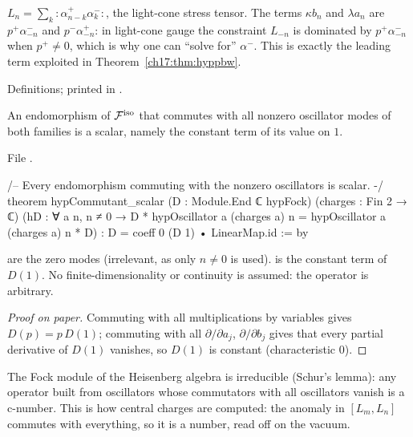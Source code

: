 \begin{physics}
$L_n=\sum_k{:}\alpha^+_{n-k}\alpha^-_k{:}$, the light-cone stress tensor.  The terms $\kappa b_n$ and $\lambda a_n$ are
$p^+\alpha^-_{-n}$ and $p^-\alpha^+_{-n}$: in light-cone gauge the constraint $L_{-n}$ is dominated by
$p^+\alpha^-_{-n}$ when $p^+\neq0$, which is why one can ``solve for'' $\alpha^-$.  This is exactly the leading term
exploited in Theorem~\ref{ch17:thm:hyppbw}.
\end{physics}

\begin{status}
Definitions; printed in .
\end{status}

\begin{theorem}[Commutant]\label{ch17:thm:hypcommutant}
An endomorphism of $\mathcal{F}^{\mathrm{iso}}$ that commutes with all nonzero oscillator modes of both families is a
scalar, namely the constant term of its value on $1$.
\end{theorem}

\noindent File .
\begin{leancode}
/-- Every endomorphism commuting with the nonzero oscillators is scalar. -/
theorem hypCommutant_scalar (D : Module.End ℂ hypFock) (charges : Fin 2 → ℂ)
    (hD : ∀ a n, n ≠ 0 → D * hypOscillator a (charges a) n =
      hypOscillator a (charges a) n * D) :
    D = coeff 0 (D 1) • LinearMap.id := by
\end{leancode}

\begin{dictionary}
 are the zero modes (irrelevant, as only $n\ne0$ is used).   is the constant term of
$D(1)$.  No finite-dimensionality or continuity is assumed: the operator is arbitrary.
\end{dictionary}

\begin{proof}[Proof on paper]
Commuting with all multiplications by variables gives $D(p)=p\,D(1)$; commuting with all $\partial/\partial a_j$,
$\partial/\partial b_j$ gives that every partial derivative of $D(1)$ vanishes, so $D(1)$ is constant (characteristic $0$).
\end{proof}

\begin{physics}
The Fock module of the Heisenberg algebra is irreducible (Schur's lemma): any operator built from oscillators
whose commutators with all oscillators vanish is a c-number.  This is how central charges are computed: the
anomaly in $[L_m,L_n]$ commutes with everything, so it is a number, read off on the vacuum.
\end{physics}

